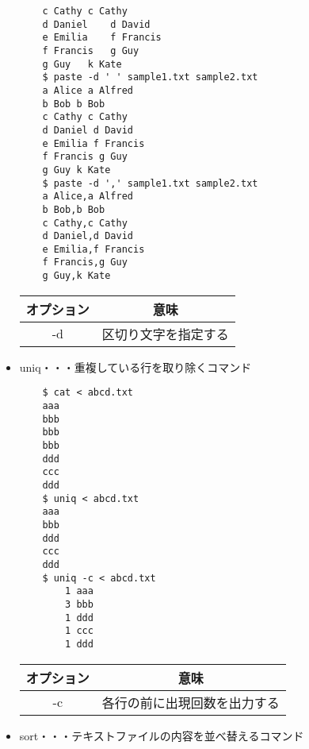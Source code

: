 \documentclass[a4paper,12pt]{jarticle}
\begin{document}
\begin{itemize}
\begin{lstlisting}
    c Cathy	c Cathy
    d Daniel	d David
    e Emilia	f Francis
    f Francis	g Guy
    g Guy	k Kate
    $ paste -d ' ' sample1.txt sample2.txt
    a Alice a Alfred
    b Bob b Bob
    c Cathy c Cathy
    d Daniel d David
    e Emilia f Francis
    f Francis g Guy
    g Guy k Kate
    $ paste -d ',' sample1.txt sample2.txt
    a Alice,a Alfred
    b Bob,b Bob
    c Cathy,c Cathy
    d Daniel,d David
    e Emilia,f Francis
    f Francis,g Guy
    g Guy,k Kate
               \end{lstlisting}
          \begin{table}[!h]
              \begin{center}
                  \begin{tabular}{|c|c|} \hline
                      オプション & 意味                 \\ \hline
                      -d         & 区切り文字を指定する \\ \hline
                  \end{tabular}
              \end{center}
          \end{table}
          \clearpage
    \item uniq・・・重複している行を取り除くコマンド
          \begin{lstlisting}
    $ cat < abcd.txt
    aaa
    bbb
    bbb
    bbb
    ddd
    ccc
    ddd
    $ uniq < abcd.txt
    aaa
    bbb
    ddd
    ccc
    ddd
    $ uniq -c < abcd.txt
        1 aaa
        3 bbb
        1 ddd
        1 ccc
        1 ddd
                   \end{lstlisting}
          \begin{table}[h]
              \begin{center}
                  \begin{tabular}{|c|c|} \hline
                      オプション & 意味                         \\ \hline
                      -c         & 各行の前に出現回数を出力する \\ \hline
                  \end{tabular}
              \end{center}
          \end{table}
          \clearpage
    \item sort・・・テキストファイルの内容を並べ替えるコマンド
          \begin{table}[h]
              \begin{center}
                  \begin{tabular}{cc}

\end{tabular}
\end{center}
\end{table}
\end{itemize}
\end{document}
